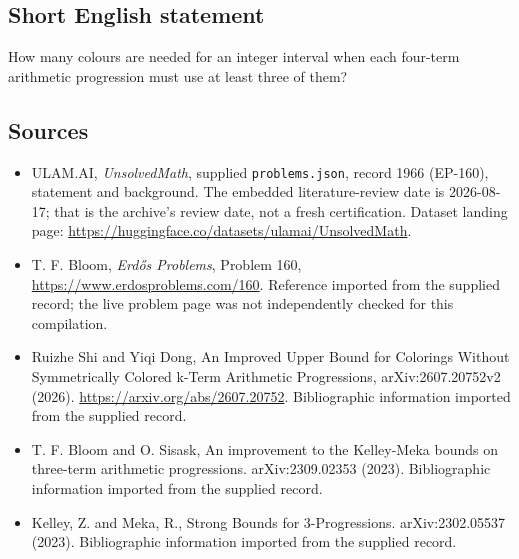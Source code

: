 \documentclass[11pt,a4paper]{article}
\begin{document}
\subsection{Short English statement}

How many colours are needed for an integer interval when each four-term arithmetic progression must use at least three of them?

\subsection{Sources}

{\small

\begin{itemize}

\item[\hypertarget{source:1966:1}{S1}] ULAM.AI, \emph{UnsolvedMath}, supplied \texttt{problems.json}, record 1966 (EP-160), statement and background. The embedded literature-review date is 2026-08-17; that is the archive’s review date, not a fresh certification. Dataset landing page: \url{https://huggingface.co/datasets/ulamai/UnsolvedMath}.

\item[\hypertarget{source:1966:2}{S2}] T. F. Bloom, \emph{Erdős Problems}, Problem 160, \url{https://www.erdosproblems.com/160}. Reference imported from the supplied record; the live problem page was not independently checked for this compilation.

\item[\hypertarget{source:1966:3}{S3}] Ruizhe Shi and Yiqi Dong, An Improved Upper Bound for Colorings Without Symmetrically Colored k-Term Arithmetic Progressions, arXiv:2607.20752v2 (2026). \url{https://arxiv.org/abs/2607.20752}. Bibliographic information imported from the supplied record.

\item[\hypertarget{source:1966:4}{S4}] T. F. Bloom and O. Sisask, An improvement to the Kelley-Meka bounds on three-term arithmetic progressions. arXiv:2309.02353 (2023). Bibliographic information imported from the supplied record.

\item[\hypertarget{source:1966:5}{S5}] Kelley, Z. and Meka, R., Strong Bounds for 3-Progressions. arXiv:2302.05537 (2023). Bibliographic information imported from the supplied record.

\end{itemize}

}

\label{end:1966}
\end{document}
